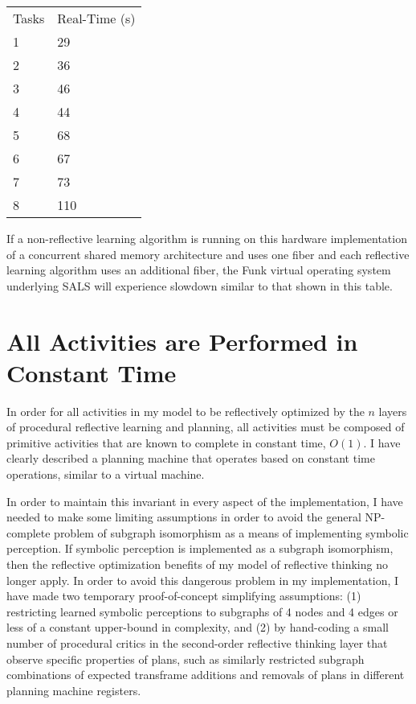 \vspace{5mm}
\begin{tabular}{ll}
Tasks & Real-Time (s) \\
1 & 29\\
2 & 36\\
3 & 46\\
4 & 44\\
5 & 68\\
6 & 67\\
7 & 73\\
8 & 110\\
\end{tabular}
\vspace{5mm}

If a non-reflective learning algorithm is running on this hardware
implementation of a concurrent shared memory architecture and uses one
fiber and each reflective learning algorithm uses an additional fiber,
the Funk virtual operating system underlying SALS will experience
slowdown similar to that shown in this table.

\section{All Activities are Performed in Constant Time}

In order for all activities in my model to be reflectively optimized
by the $n$ layers of procedural reflective learning and planning, all
activities must be composed of primitive activities that are known to
complete in constant time, $O(1)$.  I have clearly described a
planning machine that operates based on constant time operations,
similar to a virtual machine.

In order to maintain this invariant in every aspect of the
implementation, I have needed to make some limiting assumptions in
order to avoid the general NP-complete problem of subgraph isomorphism
as a means of implementing symbolic perception.  If symbolic
perception is implemented as a subgraph isomorphism, then the
reflective optimization benefits of my model of reflective thinking no
longer apply.  In order to avoid this dangerous problem in my
implementation, I have made two temporary proof-of-concept simplifying
assumptions: (1) restricting learned symbolic perceptions to subgraphs
of 4 nodes and 4 edges or less of a constant upper-bound in
complexity, and (2) by hand-coding a small number of procedural
critics in the second-order reflective thinking layer that observe
specific properties of plans, such as similarly restricted subgraph
combinations of expected transframe additions and removals of plans in
different planning machine registers.


